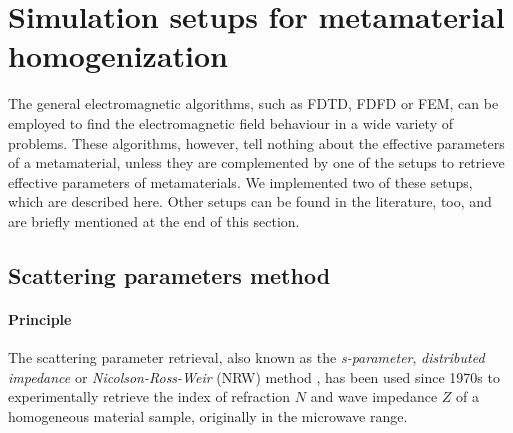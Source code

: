

\section{Simulation setups for metamaterial homogenization} %
The general electromagnetic algorithms, such as FDTD, FDFD or FEM, can be employed to find the electromagnetic field behaviour in a wide variety of problems. These algorithms, however, tell nothing about the effective parameters of a metamaterial, unless they are complemented by one of the setups to retrieve effective parameters of metamaterials. We implemented two of these setups, which are described here. Other setups can be found in the literature, too, and are briefly mentioned at the end of this section.

\subsection{Scattering parameters method}
\label{chapter_sparam}
\paragraph{Principle} %
The scattering parameter retrieval, also known as the \textit{s-parameter}, \textit{distributed impedance} or \textit{Nicolson-Ross-Weir} (NRW) method \cite{nicolson1970measurement, weir1974automatic}, has been used since 1970s to experimentally retrieve the index of refraction $N$ and wave impedance $Z$ of a homogeneous material sample, originally in the microwave range.

